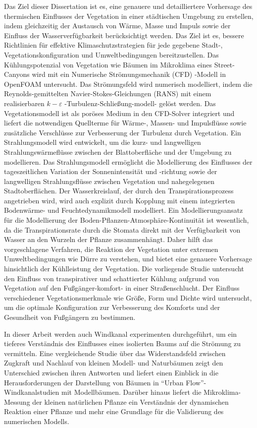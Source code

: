 Das Ziel dieser Dissertation ist es, eine genauere und detailliertere Vorhersage des thermischen Einflusses der Vegetation in einer städtischen Umgebung zu erstellen, indem gleichzeitig der Austausch von Wärme, Masse und Impuls sowie der Einfluss der Wasserverfügbarkeit berücksichtigt werden. Das Ziel ist es, bessere Richtlinien für effektive Klimaschutzstrategien für jede gegebene Stadt-, Vegetationskonfiguration und Umweltbedingungen bereitzustellen. Das Kühlungspotenzial von Vegetation wie Bäumen im Mikroklima eines Street-Canyons wird mit ein Numerische Strömungsmechanik (CFD) -Modell in OpenFOAM untersucht. Das Strömungsfeld wird numerisch modelliert, indem die Reynolds-gemittelten Navier-Stokes-Gleichungen (RANS) mit einem realisierbaren $ k- \varepsilon $ -Turbulenz-Schließung-modell- gelöst werden. Das Vegetationsmodell ist als poröses Medium in den CFD-Solver integriert und liefert die notwendigen Quellterme für Wärme-, Massen- und Impulsflüsse sowie zusätzliche Verschlüsse zur Verbesserung der Turbulenz durch Vegetation. Ein Strahlungsmodell wird entwickelt, um die kurz- und langwelligen Strahlungswärmeflüsse zwischen der Blattoberfläche und der Umgebung zu modellieren. Das Strahlungsmodell ermöglicht die Modellierung des Einflusses der tageszeitlichen Variation der Sonnenintensität und -richtung sowie der langwelligen Strahlungsflüsse zwischen Vegetation und nahegelegenen Stadtoberflächen. Der Wasserkreislauf, der durch den Transpirationsprozess angetrieben wird, wird auch explizit durch Kopplung mit einem integrierten Bodenwärme- und Feuchtedynamikmodell modelliert. Ein Modellierungsansatz für die Modellierung der Boden-Pflanzen-Atmosphäre-Kontinuität ist wesentlich, da die Transpirationsrate durch die Stomata direkt mit der Verfügbarkeit von Wasser an den Wurzeln der Pflanze zusammenhängt. Daher hilft das vorgeschlagene Verfahren, die Reaktion der Vegetation unter extremen Umweltbedingungen wie Dürre zu verstehen, und bietet eine genauere Vorhersage hinsichtlich der Kühlleistung der Vegetation. Die vorliegende Studie untersucht den Einfluss von transpirativer und schattierter Kühlung aufgrund von Vegetation auf den Fußgänger-komfort- in einer Straßenschlucht. Der Einfluss verschiedener Vegetationsmerkmale wie Größe, Form und Dichte wird untersucht, um die optimale Konfiguration zur Verbesserung des Komforts und der Gesundheit von Fußgängern zu bestimmen.

In dieser Arbeit werden auch Windkanal experimenten durchgeführt, um ein tieferes Verständnis des Einflusses eines isolierten Baums auf die Strömung zu vermitteln. Eine vergleichende Studie über das Widerstandsfeld zwischen Zugkraft und Nachlauf von kleinen Modell- und Naturbäumen zeigt den Unterschied zwischen ihren Antworten und liefert einen Einblick in die Herausforderungen der Darstellung von Bäumen in ``Urban Flow''-Windkanalstudien mit Modellbäumen. Darüber hinaus liefert die Mikroklima-Messung der kleinen natürlichen Pflanze ein Verständnis der dynamischen Reaktion einer Pflanze und mehr eine Grundlage für die Validierung des numerischen Modells.

\vfill

\pagebreak

\endgroup

\vfill
